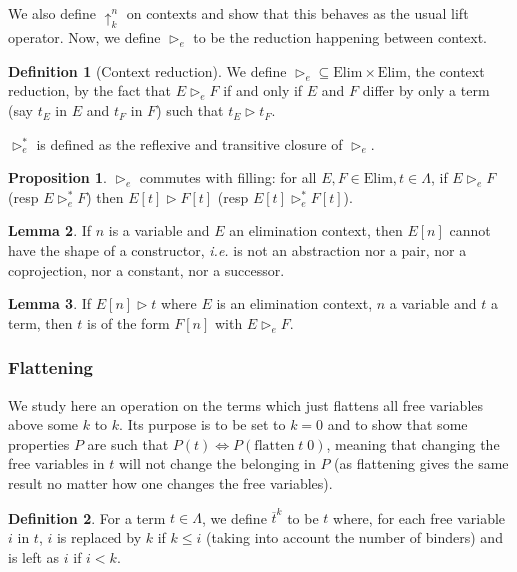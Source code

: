 \documentclass{article}
\newcommand{\lift}[2]{\uparrow_{#1}^{#2}}
\newcommand{\Elim}[0]{\mathrm{Elim}}
\newcommand{\flatten}[2]{\overline{#1}^{#2}}
\theoremstyle{definition}
\newtheorem{defi}{Definition}
\newtheorem{prop}{Proposition}[subsection]
\newtheorem{lem}[prop]{Lemma}
\begin{document}
We also define $\lift k n$ on contexts and show that this behaves as the usual lift operator. Now, we define
$\rhd_e$ to be the reduction happening between context.

\begin{defi}[Context reduction]
    We define $\rhd_e\subseteq \Elim \times \Elim$, the context reduction, by the fact that $E\rhd_e F$ if and
    only if $E$ and $F$ differ by only a term (say $t_E$ in $E$ and $t_F$ in $F$) such that $t_E\rhd t_F$.

    $\rhd_e^*$ is defined as the reflexive and transitive closure of $\rhd_e$.
\end{defi}

\begin{prop}
    $\rhd_e$ commutes with filling: for all $E,F\in\Elim,t\in\Lambda$, if $E\rhd_e F$ (resp $E\rhd_e^* F$)
    then $E[t]\rhd F[t]$ (resp $E[t]\rhd_e^* F[t]$).
\end{prop}

\begin{lem}
    If $n$ is a variable and $E$ an elimination context, then $E[n]$ cannot have the shape of a constructor,
    \textit{i.e.} is not an abstraction nor a pair, nor a coprojection, nor a constant, nor a successor.
\end{lem}

\begin{lem}
    If $E[n]\rhd t$ where $E$ is an elimination context, $n$ a variable and $t$ a term, then $t$ is of the
    form $F[n]$ with $E\rhd_e F$.
\end{lem}

\subsubsection{Flattening}

We study here an operation on the terms which just flattens all free variables above some $k$ to $k$. Its
purpose is to be set to $k = 0$ and to show that some properties $P$ are such that $P(t) \iff
P(\mathrm{flatten}\;t\;0)$, meaning that changing the free variables in $t$ will not change the belonging in
$P$ (as flattening gives the same result no matter how one changes the free variables).

\begin{defi}
    For a term $t \in\Lambda$, we define $\flatten{t}{k}$ to be $t$ where, for each free variable $i$ in $t$,
    $i$ is replaced by $k$ if $k \leq i$ (taking into account the number of binders) and is left as $i$ if
    $i < k$.
\end{defi}
\end{document}
